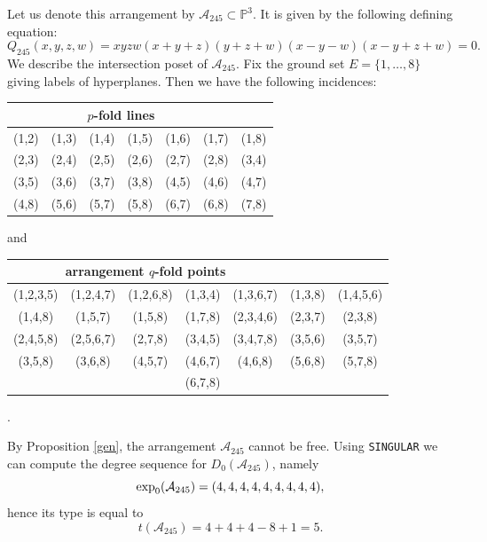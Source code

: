 \documentclass[11pt]{article}
\theoremstyle{plain}
\theoremstyle{definition}
\begin{document}
\noindent
{}
\vskip 5pt
\noindent
Let us denote this arrangement by $\mathcal{A}_{245} \subset \mathbb{P}^{3}$. It is given by the following defining equation:
$$Q_{245}(x,y,z,w) = xyzw(x+y+z)(y+z+w)(x-y-w)(x-y+z+w)=0.$$
We describe the intersection poset of $\mathcal{A}_{245}$. Fix the ground set $E = \{1, \ldots , 8\}$ giving labels of hyperplanes. Then we have the following incidences:
\begin{center}
\begin{tabular}{ c c c c c c c }
\multicolumn{6}{c}{$p$-fold lines} \\\hline \hline
(1,2) &  (1,3) & (1,4) &  (1,5) & (1,6) &  (1,7) &  (1,8)\\
(2,3) &  (2,4) & (2,5) &  (2,6) &  (2,7) &  (2,8) &  (3,4)\\
(3,5) &  (3,6) & (3,7) &  (3,8) &  (4,5) &  (4,6) &  (4,7)\\
(4,8) &  (5,6) &  (5,7) & (5,8) & (6,7) &  (6,8) &  (7,8)
\end{tabular}
\end{center}
and 
\begin{center}
\begin{tabular}{ c c c c c c c }
\multicolumn{5}{c}{arrangement $q$-fold points} \\ \hline \hline 
 (1,2,3,5) &  (1,2,4,7) &  (1,2,6,8) &  (1,3,4) &  (1,3,6,7) & (1,3,8) & (1,4,5,6) \\
 (1,4,8) & (1,5,7) &  (1,5,8) & (1,7,8) & (2,3,4,6) & (2,3,7) & (2,3,8) \\
 (2,4,5,8) & (2,5,6,7) & (2,7,8) & (3,4,5) & (3,4,7,8) & (3,5,6) & (3,5,7) \\
 (3,5,8) & (3,6,8) & (4,5,7) &  (4,6,7) & (4,6,8)&  (5,6,8)& (5,7,8) \\
 & & & (6,7,8) & & &
\end{tabular}.
\end{center}
By Proposition \ref{gen}, the arrangement $\mathcal{A}_{245}$ cannot be free. Using \texttt{SINGULAR} we can compute the degree sequence for $D_{0}(\mathcal{A}_{245})$, namely
$${\rm exp}_{0}(\mathcal{A}_{245}) = (4,4,4,4,4,4,4,4,4),$$
hence its type is equal to
$$t(\mathcal{A}_{245})=  4 + 4  + 4 - 8+1 = 5.$$
\end{document}
